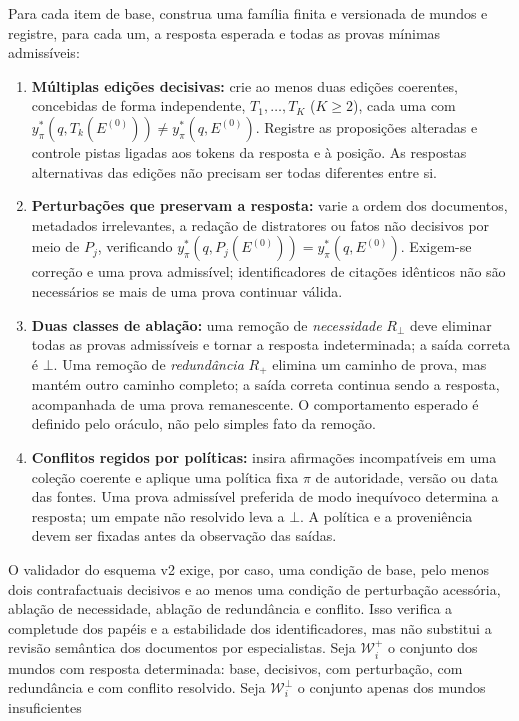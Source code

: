 \documentclass[10pt,twocolumn]{article}
\newcommand{\botans}{\bot}
\begin{document}
Para cada item de base, construa uma família finita e versionada de mundos e
registre, para cada um, a resposta esperada e todas as provas mínimas
admissíveis:
\begin{enumerate}[leftmargin=*,itemsep=1pt,topsep=3pt]
    \item \textbf{Múltiplas edições decisivas:} crie ao menos duas edições coerentes, concebidas de forma independente, $T_1,\ldots,T_K$ ($K\geq2$), cada uma com $y^*_{\pi}(q,T_k(E^{(0)}))\neq y^*_{\pi}(q,E^{(0)})$. Registre as proposições alteradas e controle pistas ligadas aos tokens da resposta e à posição. As respostas alternativas das edições não precisam ser todas diferentes entre si.
    \item \textbf{Perturbações que preservam a resposta:} varie a ordem dos documentos, metadados irrelevantes, a redação de distratores ou fatos não decisivos por meio de $P_j$, verificando $y^*_{\pi}(q,P_j(E^{(0)}))=y^*_{\pi}(q,E^{(0)})$. Exigem-se correção e uma prova admissível; identificadores de citações idênticos não são necessários se mais de uma prova continuar válida.
    \item \textbf{Duas classes de ablação:} uma remoção de \emph{necessidade} $R_\bot$ deve eliminar todas as provas admissíveis e tornar a resposta indeterminada; a saída correta é $\botans$. Uma remoção de \emph{redundância} $R_+$ elimina um caminho de prova, mas mantém outro caminho completo; a saída correta continua sendo a resposta, acompanhada de uma prova remanescente. O comportamento esperado é definido pelo oráculo, não pelo simples fato da remoção.
    \item \textbf{Conflitos regidos por políticas:} insira afirmações incompatíveis em uma coleção coerente e aplique uma política fixa $\pi$ de autoridade, versão ou data das fontes. Uma prova admissível preferida de modo inequívoco determina a resposta; um empate não resolvido leva a $\botans$. A política e a proveniência devem ser fixadas antes da observação das saídas.
\end{enumerate}
O validador do esquema v2 exige, por caso, uma condição de base, pelo menos
dois contrafactuais decisivos e ao menos uma condição de perturbação
acessória, ablação de necessidade, ablação de redundância e conflito. Isso
verifica a completude dos papéis e a estabilidade dos identificadores, mas
não substitui a revisão semântica dos documentos por especialistas.
Seja $\mathcal{W}^{+}_i$ o conjunto dos mundos com resposta determinada:
base, decisivos, com perturbação, com redundância e com conflito resolvido.
Seja $\mathcal{W}^{\bot}_i$ o conjunto apenas dos mundos insuficientes
\end{document}
